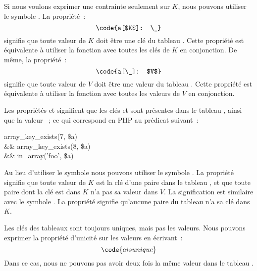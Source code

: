 Si nous voulons exprimer une contrainte seulement sur $K$, nous pouvons utiliser
le symbole \code{\_}. La propriété~:
%
$$\code{a[$K$]: \_}$$
%
signifie que toute valeur de $K$ doit être une clé du tableau . Cette
propriété est équivalente à utiliser la fonction  avec
toutes les clés de $K$ en conjonction.  De même, la propriété~:
%
$$\code{a[\_]: $V$}$$
%
signifie que toute valeur de $V$ doit être une valeur du tableau . Cette
propriété est équivalente à utiliser la fonction  avec toutes
les valeurs de $V$ en conjonction.

\begin{example}

Les propriétés  et  signifient que les clés
 et  sont présentes dans le tableau , ainsi que la
valeur ~; ce qui correspond en PHP au prédicat suivant~:
%
\begin{pre}
   array\_key\_exists(7, \$a) \\
\&\& array\_key\_exists(8, \$a) \\
\&\& in\_array('foo', \$a)
\end{pre}

\end{example}

Au lieu d'utiliser le symbole \code{:} nous pouvons utiliser le symbole
\code{!:}. La propriété  signifie que toute valeur de $K$ est
la clé d'une paire dans le tableau , et que toute paire dont la clé est
dans $K$ n'a pas sa valeur dans $V$. La signification est similaire avec le
symbole \code{\_}. La propriété  signifie qu'aucune paire du
tableau  n'a sa clé dans $K$.

Les clés des tableaux sont toujours uniques, mais pas les valeurs. Nous pouvons
exprimer la propriété d'unicité sur les valeurs en écrivant~:
%
$$\code{a is unique}$$
%
Dans ce cas, nous ne pouvons pas avoir deux fois la même valeur dans le tableau
.

